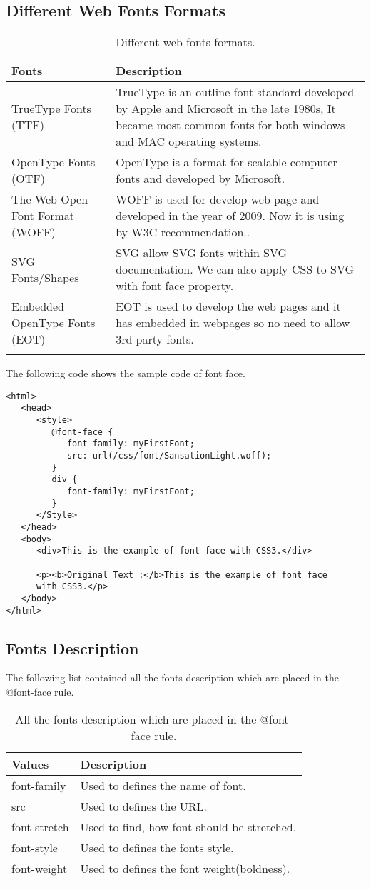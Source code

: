 \documentclass[a4paper,oneside]{book}
\numberwithin{equation}{chapter}
\begin{document}
\subsection{Different Web Fonts Formats}
\begin{center}
\begin{longtable}{|p{3cm}|p{8cm}|}
\hline
\textbf{Fonts} & \textbf{Description}\\
\hline
TrueType Fonts (TTF) & TrueType is an outline font standard developed by Apple and Microsoft in the late 1980s, It became most common fonts for both windows and MAC operating systems.\\
\hline
OpenType Fonts (OTF) & OpenType is a format for scalable computer fonts and developed by Microsoft.\\
\hline
The Web Open Font Format (WOFF) & WOFF is used for develop web page and developed in the year of 2009. Now it is using by W3C recommendation..\\
\hline
SVG Fonts/Shapes & SVG allow SVG fonts within SVG documentation. We can also apply CSS to SVG with font face property.\\
\hline
Embedded OpenType Fonts (EOT) & EOT is used to develop the web pages and it has embedded in webpages so no need to allow 3rd party fonts.\\
\hline
\caption{Different web fonts formats.}
\end{longtable}
\end{center}
The following code shows the sample code of font face.
\begin{verbatim}
<html>
   <head>
      <style>
         @font-face {
            font-family: myFirstFont;
            src: url(/css/font/SansationLight.woff);
         }
         div {
            font-family: myFirstFont;
         }
      </Style>
   </head>
   <body>
      <div>This is the example of font face with CSS3.</div>
      
      <p><b>Original Text :</b>This is the example of font face 
      with CSS3.</p>
   </body>
</html>
\end{verbatim}
\subsection{Fonts Description}
The following list contained all the fonts description which are placed in the @font-face rule.
\begin{center}
\begin{longtable}{|l|l|}
\hline
\textbf{Values} & \textbf{Description}\\
\hline
font-family & Used to defines the name of font.\\
\hline
src & Used to defines the URL.\\
\hline
font-stretch & Used to find, how font should be stretched.\\
\hline
font-style & Used to defines the fonts style.\\
\hline
font-weight & Used to defines the font weight(boldness).\\
\hline
\caption{All the fonts description which are placed in the @font-face rule.}
\end{longtable}
\end{center}
\end{document}

